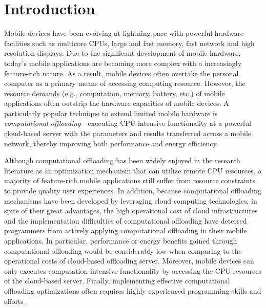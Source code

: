 \documentclass{sig-alternate}[10pt]
\begin{document}

\printccsdesc
{}
%


\section{Introduction}
Mobile devices have been evolving at lightning pace with powerful hardware facilities such as multicore CPUs, large and fast memory, fast network and high resolution displays. Due to the significant development of mobile hardware, today's mobile applications are becoming more complex with a increasingly feature-rich nature. As a result, mobile devices often overtake the personal computer as a primary means of accessing computing resource. However, the resource demands (e.g., computation, memory, battery, etc.) of mobile applications often outstrip the hardware capacities of mobile devices. A particularly popular technique to extend limited mobile hardware is \emph{computational offloading}---executing CPU-intensive functionality at a powerful cloud-based server with the parameters and results transferred across a mobile network, thereby improving both performance and energy efficiency. 

Although computational offloading has been widely enjoyed in the research literature as an optimization mechanism that can utilize remote CPU resources, a majority of feature-rich mobile applications still suffer from resource constraints to provide quality user experiences. In addition, because computational offloading mechanisms have been developed by leveraging cloud computing technologies, in spite of their great advantages, the high operational cost of cloud infrastructures and the implementation difficulties of computational offloading have deterred programmers from actively applying computational offloading in their mobile applications. In particular, performance or energy benefits gained through computational offloading would be considerably low when comparing to the operational costs of cloud-based offloading server. Moreover, mobile devices can only executes computation-intensive functionality by accessing the CPU resources of the cloud-based server. Finally, implementing effective computational offloading optimizations often requires highly experienced programming skills and efforts \cite{kwon+:mobilesoft15}.
\end{document}
